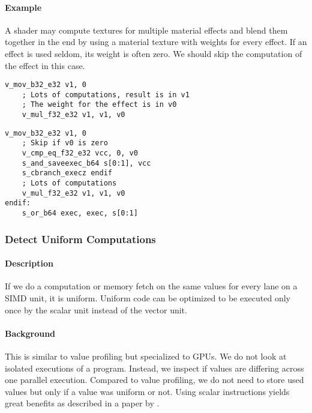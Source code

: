 \paragraph{Example} A shader may compute textures for multiple material effects and blend them together in the end by using a material texture with weights for every effect.
If an effect is used seldom, its weight is often zero. We should skip the computation of the effect in this case.\ \\
\begin{minipage}{.47\textwidth}
	\begin{lstlisting}[caption={Value Profiling --- unoptimized},frame=tlrb,language={[amdgpu]Assembler}]
	v_mov_b32_e32 v1, 0
	; Lots of computations, result is in v1
	; The weight for the effect is in v0
	v_mul_f32_e32 v1, v1, v0
	\end{lstlisting}
\end{minipage}\hfill
\begin{minipage}{.47\textwidth}
	\begin{lstlisting}[caption={Value Profiling --- optimized},frame=tlrb,language={[amdgpu]Assembler}]
	v_mov_b32_e32 v1, 0
	; Skip if v0 is zero
	v_cmp_eq_f32_e32 vcc, 0, v0
	s_and_saveexec_b64 s[0:1], vcc
	s_cbranch_execz endif
	; Lots of computations
	v_mul_f32_e32 v1, v1, v0
endif:
	s_or_b64 exec, exec, s[0:1]
	\end{lstlisting}
\end{minipage}

\subsubsection{Detect Uniform Computations}
\paragraph{Description} If we do a computation or memory fetch on the same values for every lane on a SIMD unit, it is uniform. Uniform code can be optimized to be executed only once by the scalar unit instead of the vector unit.
\paragraph{Background} This is similar to value profiling but specialized to GPUs. We do not look at isolated executions of a program. Instead, we inspect if values are differing across one parallel execution. Compared to value profiling, we do not need to store used values but only if a value was uniform or not. Using scalar instructions yields great benefits as described in a paper by \citet{Chen2016}.
